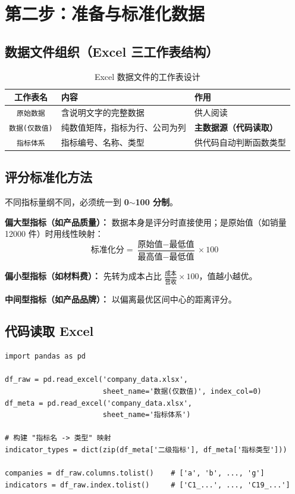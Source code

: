 \documentclass[a4paper,11pt]{ctexart}
\begin{document}
\section{第二步：准备与标准化数据}

\subsection{数据文件组织（Excel 三工作表结构）}

\begin{table}[H]
\centering
\caption{Excel 数据文件的工作表设计}
\begin{tabular}{cll}
\toprule
\textbf{工作表名} & \textbf{内容} & \textbf{作用} \\
\midrule
\texttt{原始数据} & 含说明文字的完整数据 & 供人阅读 \\
\texttt{数据(仅数值)} & 纯数值矩阵，指标为行、公司为列 & \textbf{主数据源（代码读取）} \\
\texttt{指标体系} & 指标编号、名称、类型 & 供代码自动判断函数类型 \\
\bottomrule
\end{tabular}
\end{table}

\subsection{评分标准化方法}

不同指标量纲不同，必须统一到 \textbf{0$\sim$100 分制}。

\textbf{偏大型指标（如产品质量）：}
数据本身是评分时直接使用；是原始值（如销量 12000 件）时用线性映射：
\[
\text{标准化分} = \frac{\text{原始值} - \text{最低值}}{\text{最高值} - \text{最低值}} \times 100
\]

\textbf{偏小型指标（如材料费）：}
先转为成本占比 $\frac{\text{成本}}{\text{营收}} \times 100$，值越小越优。

\textbf{中间型指标（如产品品牌）：}
以偏离最优区间中心的距离评分。

\subsection{代码读取 Excel}

\begin{lstlisting}
import pandas as pd

df_raw = pd.read_excel('company_data.xlsx',
                       sheet_name='数据(仅数值)', index_col=0)
df_meta = pd.read_excel('company_data.xlsx',
                       sheet_name='指标体系')

# 构建 "指标名 -> 类型" 映射
indicator_types = dict(zip(df_meta['二级指标'], df_meta['指标类型']))

companies = df_raw.columns.tolist()    # ['a', 'b', ..., 'g']
indicators = df_raw.index.tolist()     # ['C1_...', ..., 'C19_...']
\end{lstlisting}
\end{document}
